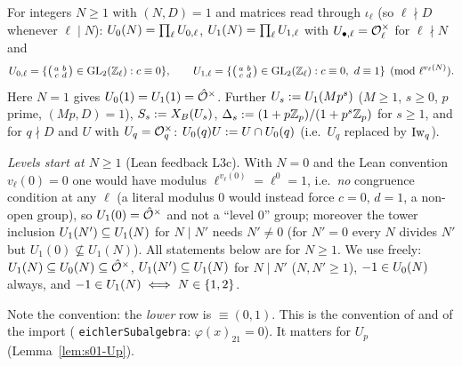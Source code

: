 \begin{definition}\label{def:s01-levels}
For integers $N\ge1$ with $(N,D)=1$ and matrices read through $\iota_\ell$ (so $\ell\nmid D$ whenever $\ell\mid N$):
$U_0(N)=\prod_\ell U_{0,\ell}$, $U_1(N)=\prod_\ell U_{1,\ell}$ with $U_{\bullet,\ell}=\mathcal{O}_\ell^\times$ for $\ell\nmid N$ and
\[U_{0,\ell}=\{\left(\begin{smallmatrix}a&b\\c&d\end{smallmatrix}\right)\in\GL_2(\Z_\ell):c\equiv0\},\qquad
U_{1,\ell}=\{\left(\begin{smallmatrix}a&b\\c&d\end{smallmatrix}\right)\in\GL_2(\Z_\ell):c\equiv0,\ d\equiv1\}\pmod{\ell^{v_\ell(N)}}.\]
Here $N=1$ gives $U_0(1)=U_1(1)=\hat{\mathcal{O}}^\times$. Further $U_s:=U_1(Mp^s)$ ($M\ge1$, $s\ge0$, $p$ prime, $(Mp,D)=1$), $S_s:=X_B(U_s)$, $\Delta_s:=(1+p\mathbb{Z}_p)/(1+p^s\mathbb{Z}_p)$ for $s\ge1$, and for $q\nmid D$ and $U$ with
$U_q=\mathcal{O}_q^\times$: $U_0(q)U:=U\cap U_0(q)$ (i.e.\ $U_q$ replaced by $\mathrm{Iw}_q$).
\end{definition}
\noindent\emph{Levels start at $N\ge1$} (Lean feedback L3c). With $N=0$ and the Lean convention $v_\ell(0)=0$ one would have modulus $\ell^{v_\ell(0)}=\ell^0=1$, i.e.\ \emph{no}
congruence condition at any $\ell$ (a literal modulus $0$ would instead force $c=0$, $d=1$, a non-open group), so $U_1(0)=\hat{\mathcal{O}}^\times$ and not a ``level $0$''
group; moreover the tower inclusion $U_1(N')\subseteq U_1(N)$ for $N\mid N'$ needs $N'\ne0$ (for $N'=0$ every $N$ divides $N'$
but $U_1(0)\not\subseteq U_1(N)$). All statements below are for $N\ge1$. We use freely: $U_1(N)\subseteq U_0(N)\subseteq\hat{\mathcal{O}}^\times$,
$U_1(N')\subseteq U_1(N)$ for $N\mid N'$ ($N,N'\ge1$), $-1\in U_0(N)$ always, and $-1\in U_1(N)\iff N\in\{1,2\}$.

\noindent Note the convention: the \emph{lower} row is $\equiv(0,1)$. This is the convention of
 and of the import
( \texttt{eichlerSubalgebra}: $\varphi(x)_{21}=0$). It matters for $U_p$
(Lemma~\ref{lem:s01-Up}).

